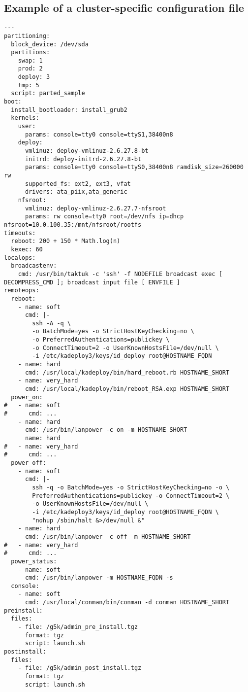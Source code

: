 \documentclass[a4wide,10pt,oneside]{book}
\begin{document}
\subsection{Example of a cluster-specific configuration file}
\begin{small}
\begin{verbatim}
---
partitioning:
  block_device: /dev/sda
  partitions:
    swap: 1
    prod: 2
    deploy: 3
    tmp: 5
  script: parted_sample
boot:
  install_bootloader: install_grub2
  kernels:
    user:
      params: console=tty0 console=ttyS1,38400n8
    deploy:
      vmlinuz: deploy-vmlinuz-2.6.27.8-bt
      initrd: deploy-initrd-2.6.27.8-bt
      params: console=tty0 console=ttyS0,38400n8 ramdisk_size=260000 rw
      supported_fs: ext2, ext3, vfat
      drivers: ata_piix,ata_generic
    nfsroot:
      vmlinuz: deploy-vmlinuz-2.6.27.7-nfsroot
      params: rw console=tty0 root=/dev/nfs ip=dhcp nfsroot=10.0.100.35:/mnt/nfsroot/rootfs
timeouts:
  reboot: 200 + 150 * Math.log(n)
  kexec: 60
localops:
  broadcastenv:
    cmd: /usr/bin/taktuk -c 'ssh' -f NODEFILE broadcast exec [ DECOMPRESS_CMD ]; broadcast input file [ ENVFILE ]
remoteops:
  reboot:
    - name: soft
      cmd: |-
        ssh -A -q \
        -o BatchMode=yes -o StrictHostKeyChecking=no \
        -o PreferredAuthentications=publickey \
        -o ConnectTimeout=2 -o UserKnownHostsFile=/dev/null \
        -i /etc/kadeploy3/keys/id_deploy root@HOSTNAME_FQDN
    - name: hard
      cmd: /usr/local/kadeploy/bin/hard_reboot.rb HOSTNAME_SHORT
    - name: very_hard
      cmd: /usr/local/kadeploy/bin/reboot_RSA.exp HOSTNAME_SHORT
  power_on:
#   - name: soft
#      cmd: ...
    - name: hard
      cmd: /usr/bin/lanpower -c on -m HOSTNAME_SHORT
      name: hard
#   - name: very_hard
#      cmd: ...
  power_off:
    - name: soft
      cmd: |-
        ssh -q -o BatchMode=yes -o StrictHostKeyChecking=no -o \
        PreferredAuthentications=publickey -o ConnectTimeout=2 \
        -o UserKnownHostsFile=/dev/null \
        -i /etc/kadeploy3/keys/id_deploy root@HOSTNAME_FQDN \
        "nohup /sbin/halt &>/dev/null &"
    - name: hard
      cmd: /usr/bin/lanpower -c off -m HOSTNAME_SHORT
#   - name: very_hard
#      cmd: ...
  power_status:
    - name: soft
      cmd: /usr/bin/lanpower -m HOSTNAME_FQDN -s
  console:
    - name: soft
      cmd: /usr/local/conman/bin/conman -d conman HOSTNAME_SHORT
preinstall:
  files:
    - file: /g5k/admin_pre_install.tgz
      format: tgz
      script: launch.sh
postinstall:
  files:
    - file: /g5k/admin_post_install.tgz
      format: tgz
      script: launch.sh

\end{verbatim}
\end{small}
\end{document}
